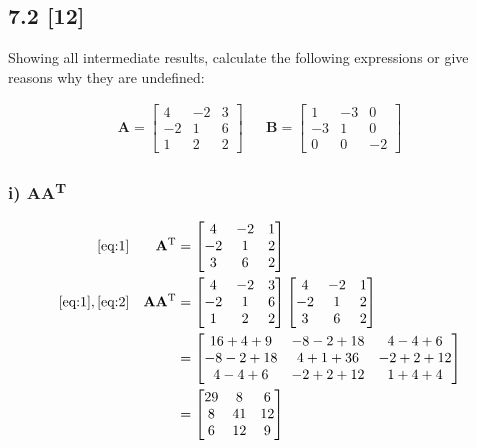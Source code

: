 \documentclass{article}
\begin{document}
\subsection*{7.2 [12]}
\setcounter{equation}{0}

Showing all intermediate results, calculate the following expressions or give reasons why they are undefined:

\def \Amatrix {
\begin{bmatrix}
4 & -2 & 3\\
-2 & 1 & 6\\
1 & 2 & 2
\end{bmatrix}
}
\def \Bmatrix {
\begin{bmatrix}
1 & -3 & 0\\
-3 & 1 & 0\\
0 & 0 & -2
\end{bmatrix}
}

\begin{align}
\label{eq:1}
\textbf{A} = \Amatrix && \textbf{B} = \Bmatrix
\end{align}

\subsubsection*{i) \textbf{AA}\textsuperscript{T}}

\begin{align}
    \label{eq:2}
    \eqref{eq:1} &&
    \textbf{A}\textsuperscript{T} &= 
    \begin{bmatrix}
    4 & -2 & 1\\
    -2 & 1 & 2\\
    3 & 6 & 2
    \end{bmatrix}
    \\
    \label{eq:3}
    \eqref{eq:1}, \eqref{eq:2} &&
    \textbf{AA}\textsuperscript{T} &=
    \Amatrix \begin{bmatrix}
    4 & -2 & 1\\
    -2 & 1 & 2\\
    3 & 6 & 2
    \end{bmatrix}
    \\
    \label{eq:4}
    && &= \begin{bmatrix}
    16+4+9 & -8-2+18 & 4-4+6\\
    -8-2+18 & 4+1+36 & -2+2+12\\
    4-4+6 & -2+2+12 & 1+4+4
    \end{bmatrix}
    \\
    \label{eq:5}
    && &= \begin{bmatrix}
    29 & 8 & 6\\
    8 & 41 & 12\\
    6 & 12 & 9
    \end{bmatrix}
\end{align}
\end{document}
